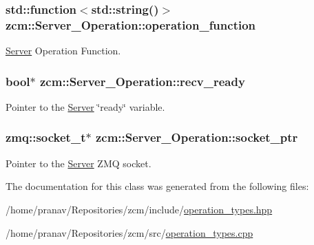 \subsubsection[{\texorpdfstring{operation\+\_\+function}{operation_function}}]{\setlength{\rightskip}{0pt plus 5cm}std\+::function$<$std\+::string()$>$ zcm\+::\+Server\+\_\+\+Operation\+::operation\+\_\+function\hspace{0.3cm}{\ttfamily [private]}}\hypertarget{classzcm_1_1Server__Operation_a9fe0d75b858647a21323293746df6c9e}{}\label{classzcm_1_1Server__Operation_a9fe0d75b858647a21323293746df6c9e}


\hyperlink{classzcm_1_1Server}{Server} Operation Function. 

\subsubsection[{\texorpdfstring{recv\+\_\+ready}{recv_ready}}]{\setlength{\rightskip}{0pt plus 5cm}bool$\ast$ zcm\+::\+Server\+\_\+\+Operation\+::recv\+\_\+ready\hspace{0.3cm}{\ttfamily [private]}}\hypertarget{classzcm_1_1Server__Operation_a2b71778be842aedf6d122b531e186ca8}{}\label{classzcm_1_1Server__Operation_a2b71778be842aedf6d122b531e186ca8}


Pointer to the \hyperlink{classzcm_1_1Server}{Server} \char`\"{}ready\char`\"{} variable. 

\subsubsection[{\texorpdfstring{socket\+\_\+ptr}{socket_ptr}}]{\setlength{\rightskip}{0pt plus 5cm}zmq\+::socket\+\_\+t$\ast$ zcm\+::\+Server\+\_\+\+Operation\+::socket\+\_\+ptr\hspace{0.3cm}{\ttfamily [private]}}\hypertarget{classzcm_1_1Server__Operation_a07efad79c512d03a54fe2bb99166d52f}{}\label{classzcm_1_1Server__Operation_a07efad79c512d03a54fe2bb99166d52f}


Pointer to the \hyperlink{classzcm_1_1Server}{Server} Z\+MQ socket. 



The documentation for this class was generated from the following files\+:\begin{DoxyCompactItemize}
\item 
/home/pranav/\+Repositories/zcm/include/\hyperlink{operation__types_8hpp}{operation\+\_\+types.\+hpp}\item 
/home/pranav/\+Repositories/zcm/src/\hyperlink{operation__types_8cpp}{operation\+\_\+types.\+cpp}\end{DoxyCompactItemize}
